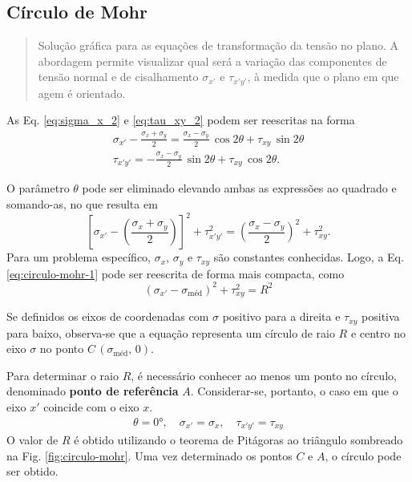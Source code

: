 \documentclass[11pt]{article}
\begin{document}
	\subsection{Círculo de Mohr}
	
	\begin{quote}
		\small Solução gráfica para as equações de transformação da tensão no plano. A abordagem permite visualizar qual será a variação das componentes de tensão normal e de cisalhamento $\sigma_{x'}$ e $\tau_{x'y'}$, à medida que o plano em que agem é orientado.
	\end{quote}

	As Eq. \ref{eq:sigma_x_2} e \ref{eq:tau_xy_2} podem ser reescritas na forma
	\begin{gather*}
		\sigma_{x'}-\frac{\sigma_x+\sigma_y}{2}=\frac{\sigma_x-\sigma_y}{2}\, \cos 2\theta + \tau_{xy}\, \sin 2\theta \\
		\tau_{x'y'}=-\frac{\sigma_x-\sigma_y}{2}\, \sin 2\theta + \tau_{xy}\, \cos 2\theta.
	\end{gather*}
	
	O parâmetro $\theta$ pode ser eliminado elevando ambas as expressões ao quadrado e somando-as, no que resulta em
	\begin{equation}
		\left[\sigma_{x'}-\left(\frac{\sigma_x+\sigma_y}{2}\right)\right]^2+\tau_{x'y'}^2=\left(\frac{\sigma_x-\sigma_y}{2}\right)^2+\tau_{xy}^2.
		\label{eq:circulo-mohr-1}
	\end{equation}
	Para um problema específico, $\sigma_x$, $\sigma_y$ e $\tau_{xy}$ são constantes conhecidas. Logo, a Eq. \ref{eq:circulo-mohr-1} pode ser reescrita de forma mais compacta, como
	\begin{equation}
		(\sigma_{x'}-\sigma_{\text{méd}})^2 + \tau_{xy}^2=R^2
		\label{eq:circulo-mohr-2}
	\end{equation}

	Se definidos os eixos de coordenadas com $\sigma$ positivo para a direita e $\tau_{xy}$ positiva para baixo, observa-se que a equação representa um círculo de raio $R$ e centro no eixo $\sigma$ no ponto $C\,(\sigma_{\text{méd}},\,0)$.
	
	Para determinar o raio $R$, é necessário conhecer ao menos um ponto no círculo, denominado \textbf{ponto de referência} $A$. Considerar-se, portanto, o caso em que o eixo $x'$ coincide com o eixo $x$.
	\begin{gather*}
		\theta=\ang{0},\quad \sigma_{x'}=\sigma_{x},\quad \tau_{x'y'}=\tau_{xy}
	\end{gather*}
	O valor de $R$ é obtido utilizando o teorema de Pitágoras ao triângulo sombreado na Fig. \ref{fig:circulo-mohr}. Uma vez determinado os pontos $C$ e $A$, o círculo pode ser obtido.
	
\end{document}
